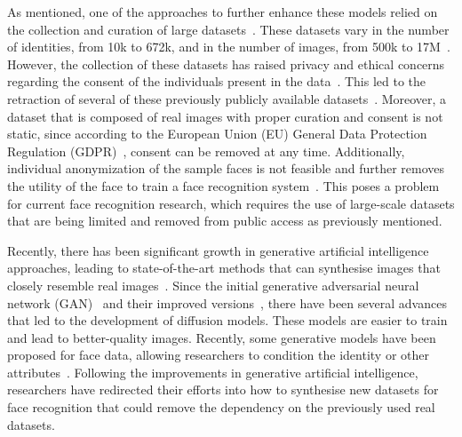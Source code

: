 \documentclass[a4paper, 10pt, conference]{ieeeconf}      %
\begin{document}
As mentioned, one of the approaches to further enhance these models relied on the collection and curation of large datasets~\cite{zhu2021webface260m}. These datasets vary in the number of identities, from 10k to 672k, and in the number of images, from 500k to 17M~\cite{yi2014learning,an2021partial, NechMegaFace2017}. However, the collection of these datasets has raised privacy and ethical concerns regarding the consent of the individuals present in the data~\cite{boutros2023idiff}. This led to the retraction of several of these previously publicly available datasets~\cite{cao2018vggface2}. Moreover, a dataset that is composed of real images with proper curation and consent is not static, since according to the European Union (EU) General Data Protection Regulation (GDPR)~\cite{regulation2016regulation}, consent can be removed at any time. Additionally, individual anonymization of the sample faces is not feasible and further removes the utility of the face to train a face recognition system~\cite{meden2021privacy}.  This poses a problem for current face recognition research, which requires the use of large-scale datasets that are being limited and removed from public access as previously mentioned.

Recently, there has been significant growth in generative artificial intelligence approaches, leading to state-of-the-art methods that can synthesise images that closely resemble real images~\cite{kim2023dcface, alayrac2022flamingo}. Since the initial generative adversarial neural network (GAN)~\cite{goodfellow2014generative} and their improved versions~\cite{karras2018progressive}, there have been several advances that led to the development of diffusion models. These models are easier to train and lead to better-quality images. Recently, some generative models have been proposed for face data, allowing researchers to condition the identity or other attributes~\cite{boutros2023idiff,boutros2024sface2}. Following the improvements in generative artificial intelligence, researchers have redirected their efforts into how to synthesise new datasets for face recognition that could remove the dependency on the previously used real datasets. 
\end{document}
